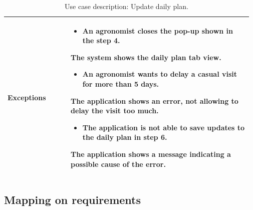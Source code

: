 \begin{table}[H]
\begin{tabular}{@{}p{0.25\linewidth} p{0.72\linewidth}@{}}
		\textbf{Exceptions}         & \begin{itemize}[leftmargin=.4cm,noitemsep,topsep=0pt,before=\vspace{-3mm}]
		   \item An agronomist closes the pop-up shown in the step 4.
		\end{itemize}
	    The system shows the daily plan tab view. \begin{itemize}[leftmargin=.4cm,noitemsep,topsep=0pt]
		   \item An agronomist wants to delay a casual visit for more than 5 days.
		\end{itemize}
		The application shows an error, not allowing to delay the visit too much.
	    \begin{itemize}[leftmargin=.4cm,noitemsep,topsep=0pt]
		   \item The application is not able to save updates to the daily plan in step 6. 
		\end{itemize}
		The application shows a message indicating a possible cause of the error.
		\\\bottomrule
	\end{tabular}
	\caption{Use case description: Update daily plan.} 
\end{table}


\subsection{Mapping on requirements}

